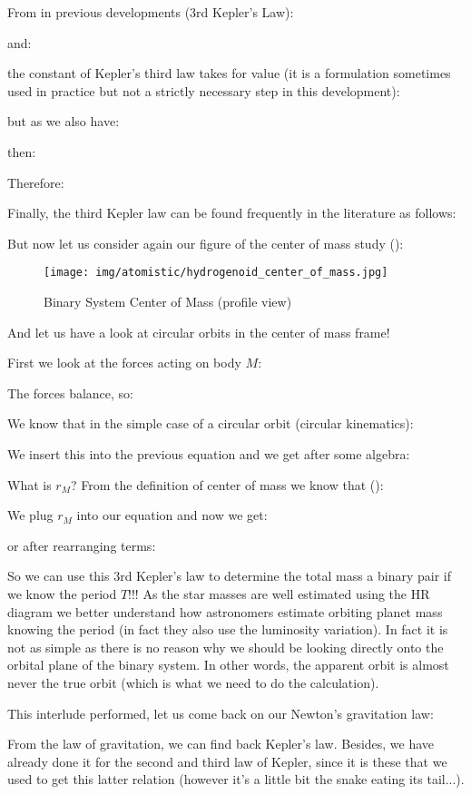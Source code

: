 	From in previous developments (3rd Kepler's Law):
	
	and:
	
	the constant of Kepler's third law takes for value (it is a formulation sometimes used in practice but not a strictly necessary step in this development):
	
	but as we also have:
	
	then:
	
	Therefore:
	
	Finally, the third Kepler law can be found frequently in the literature as follows:
	
	But now let us consider again our figure of the center of mass study ():
	\begin{figure}[H]
		\centering
		\texttt{[image: img/atomistic/hydrogenoid\_center\_of\_mass.jpg]}
		\caption[]{Binary System Center of Mass (profile view)}
	\end{figure}
	And let us have a look at circular orbits in the center of mass frame! 
	
	First we look at the forces acting on body $M$:
	
	The forces balance, so:
	
	We know that in the simple case of a circular orbit (circular kinematics):
	
	We insert this into the previous equation and we get after some algebra:
	
	What is $r_M$? From the definition of center of mass we know that ():
	
	We plug $r_M$ into our equation and now we get:
	
	or after rearranging terms:
	
	So we can use this 3rd Kepler's law to determine the total mass a binary pair if we know the period $T$!!! As the star masses are well estimated using the HR diagram we better understand how astronomers estimate orbiting planet mass knowing the period (in fact they also use the luminosity variation). In fact it is not as simple as there is no reason why we should be looking directly onto the orbital plane of the binary system. In other words, the apparent orbit is almost never the true orbit (which is what we need to do the calculation).
	
	This interlude performed, let us come back on our Newton's gravitation law:
	
	From the law of gravitation, we can find back Kepler's law. Besides, we have already done it for the second and third law of Kepler, since it is these that we used to get this latter relation (however it's a little bit the snake eating its tail...).
	

